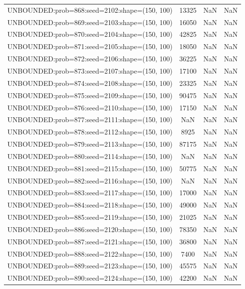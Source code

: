 \begin{longtable}{lccc}
UNBOUNDED:prob=868:seed=2102:shape=(150, 100) & 13325 &   NaN &    NaN \\
UNBOUNDED:prob=869:seed=2103:shape=(150, 100) & 16050 &   NaN &    NaN \\
UNBOUNDED:prob=870:seed=2104:shape=(150, 100) & 42825 &   NaN &    NaN \\
UNBOUNDED:prob=871:seed=2105:shape=(150, 100) & 18050 &   NaN &    NaN \\
UNBOUNDED:prob=872:seed=2106:shape=(150, 100) & 36225 &   NaN &    NaN \\
UNBOUNDED:prob=873:seed=2107:shape=(150, 100) & 17100 &   NaN &    NaN \\
UNBOUNDED:prob=874:seed=2108:shape=(150, 100) & 23325 &   NaN &    NaN \\
UNBOUNDED:prob=875:seed=2109:shape=(150, 100) & 90475 &   NaN &    NaN \\
UNBOUNDED:prob=876:seed=2110:shape=(150, 100) & 17150 &   NaN &    NaN \\
UNBOUNDED:prob=877:seed=2111:shape=(150, 100) &   NaN &   NaN &    NaN \\
UNBOUNDED:prob=878:seed=2112:shape=(150, 100) &  8925 &   NaN &    NaN \\
UNBOUNDED:prob=879:seed=2113:shape=(150, 100) & 87175 &   NaN &    NaN \\
UNBOUNDED:prob=880:seed=2114:shape=(150, 100) &   NaN &   NaN &    NaN \\
UNBOUNDED:prob=881:seed=2115:shape=(150, 100) & 50775 &   NaN &    NaN \\
UNBOUNDED:prob=882:seed=2116:shape=(150, 100) &   NaN &   NaN &    NaN \\
UNBOUNDED:prob=883:seed=2117:shape=(150, 100) & 17000 &   NaN &    NaN \\
UNBOUNDED:prob=884:seed=2118:shape=(150, 100) & 49000 &   NaN &    NaN \\
UNBOUNDED:prob=885:seed=2119:shape=(150, 100) & 21025 &   NaN &    NaN \\
UNBOUNDED:prob=886:seed=2120:shape=(150, 100) & 78350 &   NaN &    NaN \\
UNBOUNDED:prob=887:seed=2121:shape=(150, 100) & 36800 &   NaN &    NaN \\
UNBOUNDED:prob=888:seed=2122:shape=(150, 100) &  7400 &   NaN &    NaN \\
UNBOUNDED:prob=889:seed=2123:shape=(150, 100) & 45575 &   NaN &    NaN \\
UNBOUNDED:prob=890:seed=2124:shape=(150, 100) & 42200 &   NaN &    NaN \\

\end{longtable}
